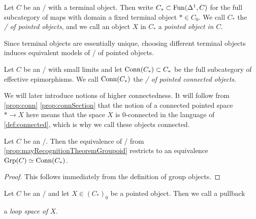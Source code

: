 \begin{definition}
    Let $C$ be an \inftycat/ with a terminal object.
    Then write $C_*\subset\operatorname{Fun}(\Delta^1,C)$ for the full subcategory of maps with domain a fixed terminal object $*\in C_0$.
    We call $C_*$ the \emph{\inftycat/ of pointed objects}, and we call an object $X$ in $C_*$ a \emph{pointed object in $C$}.
\end{definition}
\begin{remark}
    Since terminal objects are essentially unique, choosing different terminal objects induces equivalent models of \inftycats/ of pointed objects.
\end{remark}
\begin{definition}\label{def:catOfPtdConnObj}
    Let $C$ be an \inftycat/ with small limits and let $\operatorname{Conn}(C_*)\subset C_*$ be the full subcategory of effective epimorphisms.
    We call $\operatorname{Conn}(C_*)$ the \emph{\inftycat/ of pointed connected objects}.
\end{definition}
\begin{remark}
    We will later introduce notions of higher connectedness. 
    It will follow from \cref{prop:conn} \ref{prop:connSection} that the notion of a connected pointed space $*\to X$ here means that the space $X$ is $0$-connected in the language of \cref{def:connected}, which is why we call these objects connected.
\end{remark}
\begin{corollary}\label{prop:mayRecognitionTheoremGroup}
    Let $C$ be an \inftytop/. 
    Then the equivalence of \inftycats/ from \cref{prop:mayRecognitionTheoremGroupoid} restricts to an equivalence $\operatorname{Grp}(C)\simeq\operatorname{Conn}(C_*)$.
    \begin{proof}
        This follows immediately from the definition of group objects.
    \end{proof}
\end{corollary}
\begin{definition}\label{def:loopSpace}
    Let $C$ be an \inftytop/ and let $X\in\left(C_*\right)_0$ be a pointed object.
    Then we call a pullback
    \begin{center}
    \end{center}
    a \emph{loop space of $X$}.
\end{definition}

